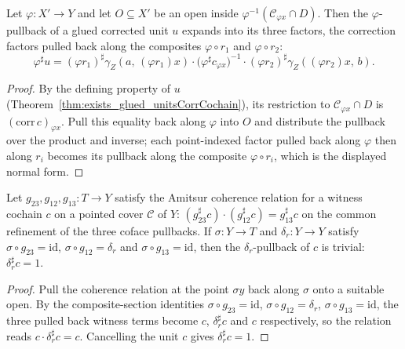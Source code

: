 \begin{theorem}
  \label{thm:unitsAppLE_glued_corr}
  \leanok
  Let \(\varphi \colon X' \to Y\) and let \(O \subseteq X'\) be an open inside
  \(\varphi^{-1}(\mathcal C_{\varphi x} \cap D)\). Then the \(\varphi\)-pullback of a glued
  corrected unit \(u\) expands into its three factors, the correction factors pulled back along
  the composites \(\varphi \circ r_1\) and \(\varphi \circ r_2\):
  \[
    \varphi^{\sharp} u =
      (\varphi r_1)^{\sharp}\gamma_Z(a,\, (\varphi r_1)x) \cdot
      \bigl(\varphi^{\sharp} c_{\varphi x}\bigr)^{-1} \cdot
      (\varphi r_2)^{\sharp}\gamma_Z((\varphi r_2)x,\, b) .
  \]
\end{theorem}
\begin{proof}
  \leanok
  By the defining property of \(u\) (Theorem~\ref{thm:exists_glued_unitsCorrCochain}), its
  restriction to \(\mathcal C_{\varphi x} \cap D\) is \((\mathrm{corr}\,c)_{\varphi x}\). Pull
  this equality back along \(\varphi\) into \(O\) and distribute the pullback over the product
  and inverse; each point-indexed factor pulled back along \(\varphi\) then along \(r_i\)
  becomes its pullback along the composite \(\varphi \circ r_i\), which is the displayed normal
  form.
\end{proof}

\begin{theorem}
  \label{thm:unitsAppLE_eq_one_of_coherent}
  \leanok
  Let \(g_{23}, g_{12}, g_{13} \colon T \to Y\) satisfy the Amitsur coherence relation for a
  witness cochain \(c\) on a pointed cover \(\mathcal C\) of \(Y\):
  \((g_{23}^{\sharp} c) \cdot (g_{12}^{\sharp} c) = g_{13}^{\sharp} c\) on the common
  refinement of the three coface pullbacks. If \(\sigma \colon Y \to T\) and \(\delta_r \colon
  Y \to Y\) satisfy \(\sigma \circ g_{23} = \mathrm{id}\), \(\sigma \circ g_{12} = \delta_r\)
  and \(\sigma \circ g_{13} = \mathrm{id}\), then the \(\delta_r\)-pullback of \(c\) is
  trivial: \(\delta_r^{\sharp} c = 1\).
\end{theorem}
\begin{proof}
  \leanok
  Pull the coherence relation at the point \(\sigma y\) back along \(\sigma\) onto a suitable
  open. By the composite-section identities \(\sigma \circ g_{23} = \mathrm{id}\),
  \(\sigma \circ g_{12} = \delta_r\), \(\sigma \circ g_{13} = \mathrm{id}\), the three pulled
  back witness terms become \(c\), \(\delta_r^{\sharp} c\) and \(c\) respectively, so the
  relation reads \(c \cdot \delta_r^{\sharp} c = c\). Cancelling the unit \(c\) gives
  \(\delta_r^{\sharp} c = 1\).
\end{proof}

